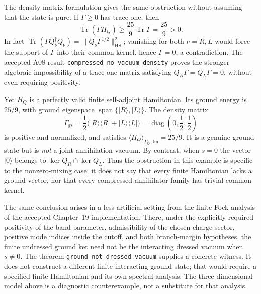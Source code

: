 The density-matrix formulation gives the same obstruction without
assuming that the state is pure.  If $\Gamma\geq0$ has trace one, then
\begin{equation}
 \operatorname{Tr}(\Gamma H_Q)
 \geq\frac{25}{9}\operatorname{Tr}\Gamma
 =\frac{25}{9}>0.
 \label{eq:ch19-no-compressed-vacuum}
\end{equation}
In fact
$\operatorname{Tr}(\Gamma Q_\nu^\dagger Q_\nu)
 =\|Q_\nu\Gamma^{1/2}\|_{\mathrm{HS}}^2$;
vanishing for both $\nu=R,L$ would force the support of $\Gamma$
into their common kernel, hence $\Gamma=0$, a contradiction.  The
accepted A08 result \texttt{compressed\_no\_vacuum\_density}
proves the stronger algebraic impossibility of a trace-one matrix
satisfying $Q_R\Gamma=Q_L\Gamma=0$, without even requiring positivity.

Yet $H_Q$ is a perfectly valid finite self-adjoint Hamiltonian.  Its
ground energy is $25/9$, with ground eigenspace
$\operatorname{span}\{|R\rangle,|L\rangle\}$.  The density matrix
\begin{equation}
 \Gamma_{\mathrm{gs}}
  =\frac12\bigl(|R\rangle\langle R|
                   +|L\rangle\langle L|\bigr)
  =\operatorname{diag}\!\left(0,\frac12,\frac12\right)
 \label{eq:ch19-finite-ground-density}
\end{equation}
is positive and normalized, and satisfies
$\langle H_Q\rangle_{\Gamma_{\mathrm{gs}},\mathrm{fin}}=25/9$.
It is a genuine ground state but is \emph{not} a joint annihilation
vacuum.  By contrast, when $s=0$ the vector $|0\rangle$ belongs to
$\ker Q_R\cap\ker Q_L$.  Thus the obstruction in this example is
specific to the nonzero-mixing case; it does not say that every finite
Hamiltonian lacks a ground vector, nor that every compressed annihilator
family has trivial common kernel.

The same conclusion arises in a less artificial setting from the
finite-Fock analysis of the accepted Chapter~19 implementation.
There, under the explicitly required positivity of the band parameter,
admissibility of the chosen charge sector, positive mode indices inside
the cutoff, and both branch-margin hypotheses, the finite undressed
ground ket need not be the interacting dressed vacuum when $s\ne0$.
The theorem \texttt{ground\_not\_dressed\_vacuum} supplies a concrete
witness.  It does not construct a different finite interacting ground
state; that would require a specified finite Hamiltonian and its own
spectral analysis.  The three-dimensional model above is a diagnostic
counterexample, not a substitute for that analysis.

